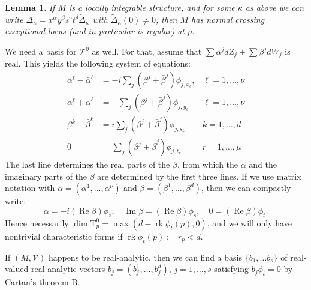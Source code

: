 \documentclass[11pt]{amsart}
\newcommand{\crb}{\mathcal{V}}
\newcommand{\charforms}{\mathrm{T}^0}
\newcommand{\charsheaf}{\mathcal{T}^0}
\DeclareMathOperator{\rank}{rk}
\DeclareMathOperator{\imag}{Im}
\DeclareMathOperator{\real}{Re}
\theoremstyle{definition}
\theoremstyle{remark}
\theoremstyle{plain}
\newtheorem{lem}[defn]{Lemma}
\begin{document}
\begin{lem}
  \label{lem:charnormal} If $M$ is a locally integrable structure, and for some $\kappa$ as
  above we can write $\Delta_\kappa = x^\alpha y^\beta s^\gamma t^\delta \tilde \Delta_\kappa$ with
  $\tilde \Delta_\kappa (0) \neq 0$, then $M$ has normal crossing exceptional locus (and in particular is regular) at $p$. 
\end{lem}

We need a basis for $\charsheaf $ as well. For that,
assume that $\sum \alpha^j dZ_j + \sum \beta^j dW_j$ is real. This yields the following system of equations:
\[
  \begin{aligned}
    \alpha^\ell - \bar \alpha^\ell & =  -i \sum_j (\beta^j + \bar \beta^j)  \phi_{j,x_\ell},
    &
    \ell = 1, \dots, \nu \\
    \alpha^\ell + \bar \alpha^\ell & = - \sum_j (\beta^j + \bar \beta^j) \phi_{j,y_\ell} &
    \ell = 1, \dots, \nu  \\
    \beta^k - \bar \beta^k &= i\sum_j (\beta^j + \bar \beta^j) \phi_{j, s_k}  &
    k = 1, \dots, d \\
    0 & = \sum_j  (\beta^j + \bar \beta^j) \phi_{j, t_r} &
    r = 1, \dots, \mu     
  \end{aligned}
\]
The last line determines the real parts of the $\beta$, from which the $\alpha$ and the imaginary parts of the $\beta$ are determined by the first three lines. If we use matrix notation with $\alpha = (\alpha^1 , \dots, \alpha^\nu)$ and $\beta =(\beta^1 ,\dots, \beta^d)$, then
we can compactly write:
\[ \alpha = -i(\real \beta) \phi_z , \quad \imag \beta = (\real \beta) \phi_s , \quad 0 = (\real \beta) \phi_t.\]
Hence necessarily $\dim \charforms_p = \max(d - \rank \phi_t(p), 0)$, and we will
only have nontrivial characteristic forms if $\rank \phi_t(p):= r_p <d$.

If $(M,\crb)$ happens to be real-analytic, then we can find a basis $\{b_1, \dots b_s \}$ of
real-valued real-analytic vectors $b_j = (b_j^1 , \dots ,b_j^d)$, $j=1,\dots, s$ satisfying $b_ j\phi_t = 0$ by Cartan's theorem B. 
\end{document}
